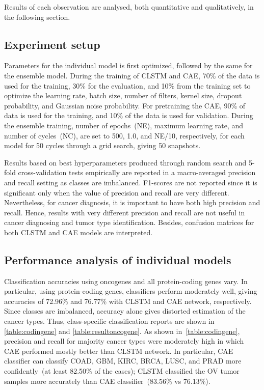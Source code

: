 \hspace*{3.5mm} Results of each observation are analysed, both quantitative and qualitatively, in the following section. 

\subsection{Experiment setup}
Parameters for the individual model is first optimized, followed by the same for the ensemble model. During the training of CLSTM and CAE, 70\% of the data is used for the training, 30\% for the evaluation, and 10\% from the training set to optimize the learning rate, batch size, number of filters, kernel size, dropout probability, and Gaussian noise probability. For pretraining the CAE, 90\% of data is used for the training, and 10\% of the data is used for validation. 
During the ensemble training, number of epochs~(NE), maximum learning rate, and number of cycles~(NC), are set to 500, 1.0, and NE/10, respectively, for each model for 50 cycles through a grid search, giving 50 snapshots. 

\hspace*{3.5mm} Results based on best hyperparameters produced through random search and 5-fold cross-validation tests empirically are reported in a macro-averaged precision and recall setting as classes are imbalanced. F1-scores are not reported since it is significant only when the value of precision and recall are very different. Nevertheless, for cancer diagnosis, it is important to have both high precision and recall. Hence, results with very different precision and recall are not useful in cancer diagnosing and tumor type identification. Besides, confusion matrices for both CLSTM and CAE models are interpreted. 

\subsection{Performance analysis of individual models}
Classification accuracies using oncogenes and all protein-coding genes vary. In particular, using protein-coding genes, classifiers perform moderately well, giving accuracies of 72.96\% and 76.77\% with CLSTM and CAE network, respectively. Since classes are imbalanced, accuracy alone gives distorted estimation of the cancer types. Thus, class-specific classification reports are shown in \cref{table:codingene} and \cref{table:resultoncogene}. As shown in~\cref{table:codingene}, precision and recall for majority cancer types were moderately high in which CAE performed mostly better than CLSTM network. In particular, CAE classifier can classify COAD, GBM, KIRC, BRCA, LUSC, and PRAD more confidently~(at least 82.50\% of the cases); CLSTM classified the OV tumor samples more accurately than CAE classifier~(83.56\% vs 76.13\%). 

